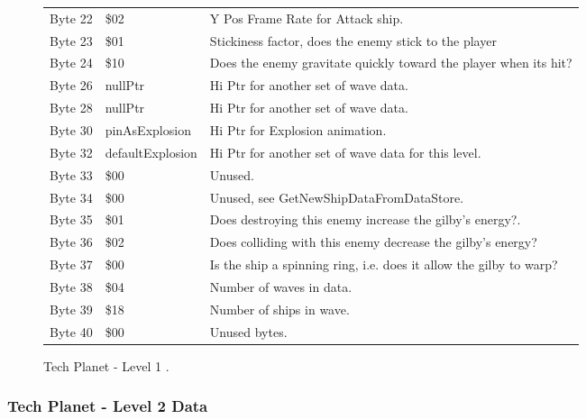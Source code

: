 \begin{figure}[H]
{\begin{adjustbox}{width=12cm}
\begin{tabular}{lll}
 Byte 22 & \$02               & Y Pos Frame Rate for Attack ship.                                  \\
 Byte 23 & \$01               & Stickiness factor, does the enemy stick to the player              \\
 Byte 24 & \$10               & Does the enemy gravitate quickly toward the player when its hit?   \\
 Byte 26 & nullPtr           & Hi Ptr for another set of wave data.                               \\
 Byte 28 & nullPtr           & Hi Ptr for another set of wave data.                               \\
 Byte 30 & pinAsExplosion    & Hi Ptr for Explosion animation.                                    \\
 Byte 32 & defaultExplosion  & Hi Ptr for another set of wave data for this level.                \\
 Byte 33 & \$00               & Unused.                                                            \\
 Byte 34 & \$00               & Unused, see GetNewShipDataFromDataStore.                           \\
 Byte 35 & \$01               & Does destroying this enemy increase the gilby's energy?.           \\
 Byte 36 & \$02               & Does colliding with this enemy decrease the gilby's energy?        \\
 Byte 37 & \$00               & Is the ship a spinning ring, i.e. does it allow the gilby to warp? \\
 Byte 38 & \$04               & Number of waves in data.                                           \\
 Byte 39 & \$18               & Number of ships in wave.                                           \\
 Byte 40 & \$00               & Unused bytes.                                                      \\
\bottomrule
\end{tabular}

  \end{adjustbox}

  }\caption*{Tech Planet - Level 1
.}
\end{figure}

\clearpage
\subsubsection{Tech Planet - Level 2 Data}

